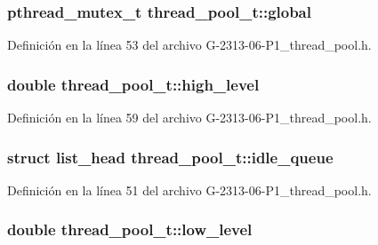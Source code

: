\subsubsection[{global}]{\setlength{\rightskip}{0pt plus 5cm}pthread\+\_\+mutex\+\_\+t thread\+\_\+pool\+\_\+t\+::global}\label{structthread__pool__t_aaa6e0a9d9c28c3f9be7eccbe8003af23}


Definición en la línea 53 del archivo G-\/2313-\/06-\/\+P1\+\_\+thread\+\_\+pool.\+h.

\hypertarget{structthread__pool__t_aa771fc181f63c16346fff1c7eb0d9014}{}
\subsubsection[{high\+\_\+level}]{\setlength{\rightskip}{0pt plus 5cm}double thread\+\_\+pool\+\_\+t\+::high\+\_\+level}\label{structthread__pool__t_aa771fc181f63c16346fff1c7eb0d9014}


Definición en la línea 59 del archivo G-\/2313-\/06-\/\+P1\+\_\+thread\+\_\+pool.\+h.

\hypertarget{structthread__pool__t_a38a9fa0d0ea1060d5bbff8421a92c1c7}{}
\subsubsection[{idle\+\_\+queue}]{\setlength{\rightskip}{0pt plus 5cm}struct {\bf list\+\_\+head} thread\+\_\+pool\+\_\+t\+::idle\+\_\+queue}\label{structthread__pool__t_a38a9fa0d0ea1060d5bbff8421a92c1c7}


Definición en la línea 51 del archivo G-\/2313-\/06-\/\+P1\+\_\+thread\+\_\+pool.\+h.

\hypertarget{structthread__pool__t_a815792ab9c936b06d46ef3e149e5fd88}{}
\subsubsection[{low\+\_\+level}]{\setlength{\rightskip}{0pt plus 5cm}double thread\+\_\+pool\+\_\+t\+::low\+\_\+level}\label{structthread__pool__t_a815792ab9c936b06d46ef3e149e5fd88}


